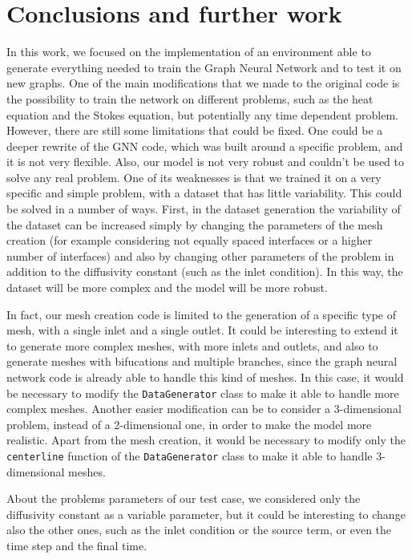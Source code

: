 \documentclass[11pt,a4paper]{article}
\begin{document}
\section{Conclusions and further work}
In this work, we focused on the implementation of an environment able to generate everything needed to train the Graph Neural Network and to test it on new graphs. One of the main modifications that we made to the original code is the possibility to train the network on different problems, such as the heat equation and the Stokes equation, but potentially any time dependent problem.
However, there are still some limitations that could be fixed. One could be a deeper rewrite of the GNN code, which was built around a specific problem, and it is not very flexible. Also, our model is not very robust and couldn't be used to solve any real problem. One of its weaknesses is that we trained it on a very specific and simple problem, with a dataset that has little variability. This could be solved in a number of ways.
First, in the dataset generation the variability of the dataset can be increased simply by changing the parameters of the mesh creation (for example considering not equally spaced interfaces or a higher number of interfaces) and also by changing other parameters of the problem in addition to the diffusivity constant (such as the inlet condition). 
In this way, the dataset will be more complex and the model will be more robust. 

In fact, our mesh creation code is limited to the generation of a specific type of mesh, with a single inlet and a single outlet. It could be interesting to extend it to generate more complex meshes, with more inlets and outlets, and also to generate meshes with bifucations and multiple branches, since the graph neural network code is already able to handle this kind of meshes. In this case, it would be necessary to modify the \texttt{DataGenerator} class to make it able to handle more complex meshes. 
Another easier modification can be to consider a 3-dimensional problem, instead of a 2-dimensional one, in order to make the model more realistic. Apart from the mesh creation, it would be necessary to modify only the \texttt{centerline}  function of the \texttt{DataGenerator} class to make it able to handle 3-dimensional meshes.

About the problems parameters of our test case, we considered only the diffusivity constant as a variable parameter, but it could be interesting to change also the other ones, such as the inlet condition or the source term, or even the time step and the final time.
\end{document}
